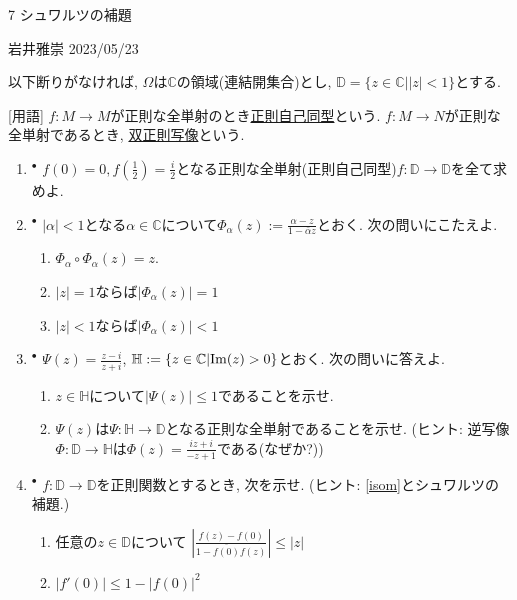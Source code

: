 \documentclass[dvipdfmx,a4paper,11pt]{article}
\newcommand{\C}{\mathbb{C}}
\newcommand{\D}{\mathbb{D}}
\theoremstyle{definition}
\begin{document}

\begin{center}
{\Large 7 シュワルツの補題}
\end{center}

\begin{flushright}
 岩井雅崇 2023/05/23
\end{flushright}
以下断りがなければ, $\Omega$は$\C$の領域(連結開集合)とし, $\D=\{z \in \C |  |z| <1\}$とする. 

[用語] $f : M \to M$が正則な全単射のとき\underline{正則自己同型}という.
$f : M\to N$が正則な全単射であるとき, \underline{双正則写像}という.


\begin{enumerate}[label=\textbf{問}7.\arabic*]

\item$^{\bullet}$ $f(0)=0, f(\frac{1}{2})=\frac{i}{2}$となる正則な全単射(正則自己同型)$f : \D \to \D$を全て求めよ.

\item \label{isom} $^{\bullet}$ $|\alpha| <1$となる$\alpha \in \C$について$\Phi_{\alpha}(z) := \frac{\alpha - z}{1 - \bar{\alpha} z}$とおく. 次の問いにこたえよ. 
  \begin{enumerate}
\setlength{\parskip}{0cm} 
  \setlength{\itemsep}{0cm} 
  \item $\Phi_{\alpha} \circ \Phi_{\alpha}(z) =z$.
  \item $|z|=1$ならば$|\Phi_{\alpha}(z)|=1$
    \item $|z|<1$ならば$|\Phi_{\alpha}(z)| < 1$
\end{enumerate}

\item \label{HtoD}$^{\bullet}$ $\Psi(z) = \frac{z-i}{z+i}$, $\mathbb{H}:=\{ z \in \C | {\rm Im}(z) >0\}$とおく. 次の問いに答えよ.
  \begin{enumerate}
\setlength{\parskip}{0cm} 
  \setlength{\itemsep}{0cm} 
  \item $z \in \mathbb{H}$について$|\Psi(z)| \le 1$であることを示せ.
  \item $\Psi(z)$は$\Psi :  \mathbb{H} \to \D$となる正則な全単射であることを示せ. (ヒント: 逆写像$\Phi : \D \to \mathbb{H}$は$\Phi(z)=\frac{iz + i}{-z +1}$である(なぜか?))
  \end{enumerate}
  
\item $^{\bullet}$ $f : \D \to \D$を正則関数とするとき, 次を示せ. (ヒント: \ref{isom}とシュワルツの補題.)
  \begin{enumerate}
\setlength{\parskip}{0cm} 
  \setlength{\itemsep}{0cm} 
  \item 任意の$z \in \D$について
  $
  \left|\frac{f(z) - f(0)}{1 - \overline{f(0)} f(z)}\right| \le |z|
  $
  \item $|f' (0)| \le 1 - |f(0)|^2$
    \end{enumerate}
    

\end{enumerate}
\end{document}
